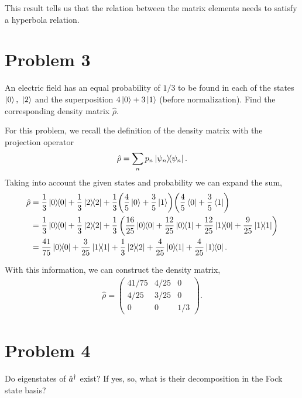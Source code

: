 \documentclass[../main.tex]{subfiles}
\begin{document}
This result tells us that the relation between the matrix elements needs to satisfy a hyperbola relation.

\section{Problem 3}

An electric field has an equal probability of $1/3$ to be found in each of the states $\ket{0},~\ket{2}$ and the superposition $4\ket{0}+3\ket{1}$ (before normalization).
Find the corresponding density matrix $\hat{\rho}$.

For this problem, we recall the definition of the density matrix with the projection operator
\begin{gather*}
    \hat{\rho} = \sum_n p_n\op{\psi_n}.
\end{gather*}
Taking into account the given states and probability we can expand the sum,
\begin{align*}
    \hat{\rho}  &= \frac{1}{3}\op{0} + \frac{1}{3}\op{2} + \frac{1}{3}\qty(\frac{4}{5}\ket{0}+\frac{3}{5}\ket{1})\qty(\frac{4}{5}\bra{0}+\frac{3}{5}\bra{1}) \\
        &= \frac{1}{3}\op{0} + \frac{1}{3}\op{2} 
            + \frac{1}{3}\left(
                \frac{16}{25}\op{0}{0}
                +\frac{12}{25}\op{0}{1}
                +\frac{12}{25}\op{1}{0}
                +\frac{9}{25}\op{1}{1}
                \right) \\
        &=\frac{41}{75}\op{0}+\frac{3}{25}\op{1}+\frac{1}{3}\op{2}+\frac{4}{25}\op{0}{1}+\frac{4}{25}\op{1}{0}.
\end{align*}

With this information, we can construct the density matrix,
\begin{gather*}
    \hat{\rho} =
        \begin{pmatrix}
            41/75 & 4/25 & 0 \\
            4/25 & 3/25 & 0 \\
            0 & 0 & 1/3
        \end{pmatrix}
        .
\end{gather*}

\section{Problem 4}

Do eigenstates of $\hat{a}^\dagger$ exist?
If yes, so, what is their decomposition in the Fock state basis?
\end{document}
